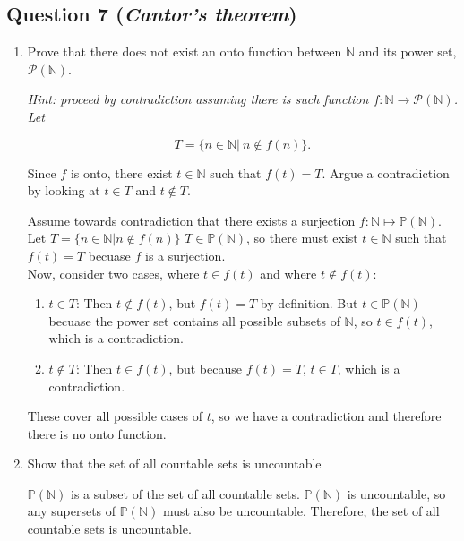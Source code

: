 \documentclass{article}
\begin{document}
\subsection*{Question 7 (\textit{Cantor's theorem})}



\begin{enumerate}
    \item Prove that there does not exist an onto function between $\mathbb{N}$ and its power set, $\mathcal{P}(\mathbb{N})$.\\

 {\it Hint: proceed by contradiction assuming there is such function $f:\mathbb{N} \rightarrow \mathcal{P}(\mathbb{N})$. Let 
 
 \[
 T=\{n\in \mathbb{N}|~n\notin f(n) \}.
 \]

Since $f$ is onto, there exist $t\in \mathbb{N}$ such that $f(t)=T$. Argue a contradiction by looking at $t\in T$ and $t\notin T$.}

\begin{mdframed}
Assume towards contradiction that there exists a surjection $f: \mathbb{N} \mapsto \mathbb{P}(\mathbb{N})$. Let $T = \{n \in \mathbb{N} | n \notin f(n) \}$ $T \in \mathbb{P}(\mathbb{N})$, so there must exist $t \in \mathbb{N}$ such that $f(t) = T$ becuase $f$ is a surjection. \\
Now, consider two cases, where $t \in f(t)$ and where $t \notin f(t)$:
\begin{enumerate}
    \item $t \in T$: Then $t \notin f(t)$, but $f(t) = T$ by definition. But $t \in \mathbb{P}(\mathbb{N})$ becuase the power set contains all possible subsets of $\mathbb{N}$, so $t \in f(t)$, which is a contradiction.
    \item $t \notin T$: Then $t \in f(t)$, but because $f(t) = T$, $t \in T$, which is a contradiction.
\end{enumerate} 
These cover all possible cases of $t$, so we have a contradiction and therefore there is no onto function.
\end{mdframed}


\item Show that the set of all countable sets is uncountable

\begin{mdframed}
$\mathbb{P}(\mathbb{N})$ is a subset of the set of all countable sets. $\mathbb{P}(\mathbb{N})$ is uncountable, so any supersets of $\mathbb{P}(\mathbb{N})$ must also be uncountable. Therefore, the set of all countable sets is uncountable.
\end{mdframed}


\end{enumerate}
\end{document}
